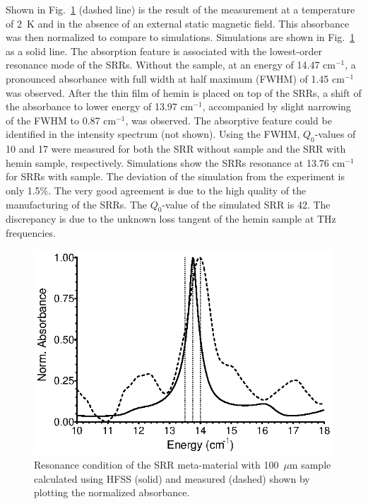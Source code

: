 Shown in Fig.~\ref{ch3-fig:resonator} (dashed line) is the result of the measurement at a temperature of 2~K and in the absence of an external static magnetic field. This absorbance was then normalized to compare to simulations. Simulations are shown in Fig.~\ref{ch3-fig:resonator} as a solid line. The absorption feature is associated with the lowest-order resonance mode of the SRRs. \cite{Katsarakis04} Without the sample, at an energy of 14.47 cm$^{-1}$, a pronounced absorbance with full width at half maximum (FWHM) of 1.45 cm$^{-1}$ was observed. After the thin film of hemin is placed on top of the SRRs, a shift of the absorbance to lower energy of 13.97 cm$^{-1}$, accompanied by slight narrowing of the FWHM to 0.87 cm$^{-1}$, was observed. The absorptive feature could be identified in the intensity spectrum (not shown). Using the FWHM, $Q_0$-values of 10 and 17 were measured for both the SRR without sample and the SRR with hemin sample, respectively. Simulations show the SRRs resonance at 13.76 cm$^{-1}$ for SRRs with sample. The deviation of the simulation from the experiment is only 1.5\%. The very good agreement is due to the high quality of the manufacturing of the SRRs. The $Q_0$-value of the simulated SRR is 42. The discrepancy is due to the unknown loss tangent of the hemin sample at THz frequencies.


\begin{figure}[htp]\centering
  \includegraphics{Kapitel/Ch3-Images/03-SRR_Profile.eps}%
  \caption[Simulated and measured SRR resonance.]{Resonance condition of the SRR meta-material with 100~$\mu$m sample calculated using HFSS (solid) and measured (dashed) shown by plotting the normalized absorbance.}
  \label{ch3-fig:resonator}
\end{figure}

